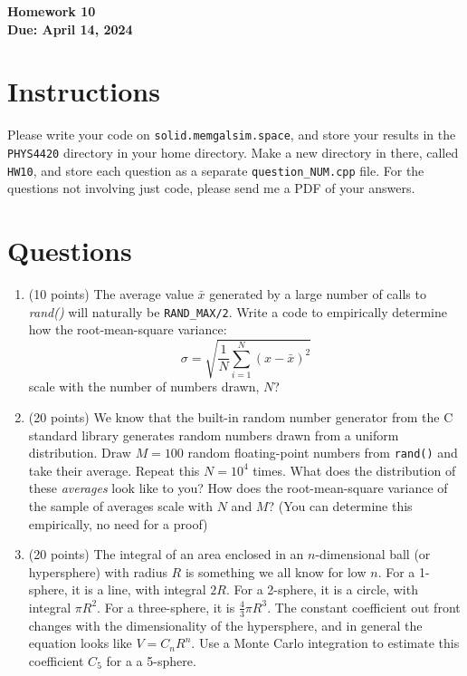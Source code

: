 \documentclass[11pt]{article}
\begin{document}
\begin{center}
\textbf{\Large Homework 10}\\
\textbf{Due: April 14, 2024}\\
\end{center}
\section*{Instructions}
Please write your code on \texttt{solid.memgalsim.space}, and store your results
in the \texttt{PHYS4420} directory in your home directory.  Make a new directory
in there, called \texttt{HW10}, and store each question as a separate
\texttt{question\_NUM.cpp} file.  For the questions not involving just code,
please send me a PDF of your answers.


\section*{Questions}
\begin{enumerate}
    \item (10 points) The average value $\bar x$ generated by a large number of
        calls to \textit{rand()} will naturally be \texttt{RAND\_MAX/2}.  Write
        a code to empirically determine how the root-mean-square variance:
        $$ \sigma = \sqrt{\frac{1}{N}\sum_{i=1}^N(x-\bar x)^2} $$
        scale with the number of numbers drawn, $N$?

    \item (20 points) We know that the built-in random number generator
        from the C standard library generates random numbers drawn from a
        uniform distribution.  Draw $M=100$ random floating-point numbers from \texttt{rand()} and
        take their average.  Repeat this $N=10^4$ times.  What does the
        distribution of these \textit{averages} look like to you?  How does the
        root-mean-square variance of the sample of averages scale with $N$ and
        $M$?  (You can determine this empirically, no need for a proof)
    \item (20 points) The integral of an area enclosed in an
        $n$-dimensional ball (or hypersphere) with radius $R$ is something we all know for low
        $n$. For a 1-sphere, it is a line, with integral $2R$.  For a 2-sphere,
        it is a circle, with integral $\pi R^2$.  For a three-sphere, it is
        $\frac{4}{3}\pi R^3$.  The constant coefficient out front changes with
        the dimensionality of the hypersphere, and in general the equation looks
        like $V = C_n R^n$.  Use a Monte Carlo integration to
        estimate this coefficient $C_5$ for a a 5-sphere.
\end{enumerate}
\end{document}
